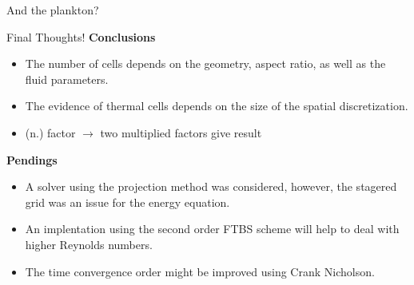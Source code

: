 \documentclass[final]{beamer}
\newlength{\onecolwid}
\begin{document}
\begin{frame}[t]
\begin{columns}[t]
\begin{column}{\onecolwid}
\begin{block}{And the plankton?}
\end{block}




\begin{alertblock}{Final Thoughts!}
\textbf{Conclusions}
\begin{itemize}
\item The number of cells depends on the geometry, aspect ratio, as well as the fluid parameters.
\item The evidence of thermal cells depends on the size of the spatial discretization.
\item (n.) factor $\rightarrow$ two multiplied factors give result
\end{itemize}
\textbf{Pendings}
\begin{itemize}
\item A solver using the projection method was considered, however, the stagered grid was an issue for the energy equation.
\item An implentation using the second order FTBS scheme will help to deal with higher Reynolds numbers.
\item The time convergence order might be improved using Crank Nicholson.
\end{itemize}

\end{alertblock}

\end{column} %

\end{columns} %

\end{frame} %
\end{document}
